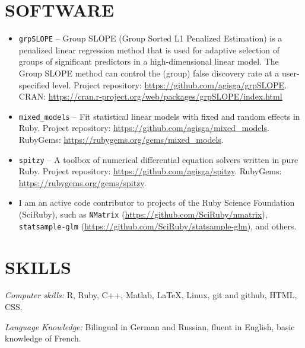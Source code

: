 \documentclass[margin]{res} %
\begin{document}
\begin{resume}
\section{SOFTWARE}

\begin{itemize} \itemsep -2pt %
    \item \verb!grpSLOPE! -- Group SLOPE (Group Sorted L1 Penalized Estimation) is a penalized linear regression method that is used for adaptive selection of groups of significant predictors in a high-dimensional linear model. The Group SLOPE method can control the (group) false discovery rate at a user-specified level. Project repository: \url{https://github.com/agisga/grpSLOPE}. CRAN: \url{https://cran.r-project.org/web/packages/grpSLOPE/index.html} 
    \item \verb!mixed_models! -- Fit statistical linear models with fixed and random effects in Ruby. Project repository: \url{https://github.com/agisga/mixed_models}. RubyGems: \url{https://rubygems.org/gems/mixed_models}.
    \item \verb!spitzy! -- A toolbox of numerical differential equation solvers written in pure Ruby. Project repository: \url{https://github.com/agisga/spitzy}. RubyGems: \url{https://rubygems.org/gems/spitzy}.
    \item I am an active code contributor to projects of the Ruby Science Foundation (SciRuby), such as \verb!NMatrix! (\url{https://github.com/SciRuby/nmatrix}), \verb!statsample-glm! (\url{https://github.com/SciRuby/statsample-glm}), and others.
\end{itemize}
 

\section{SKILLS} 

{\sl Computer skills:}
R, Ruby, C++, Matlab, \LaTeX, Linux, git and github, HTML, CSS.

{\sl Language Knowledge:}
Bilingual in German and Russian, fluent in English, basic knowledge of French.


\end{resume}
\end{document}
